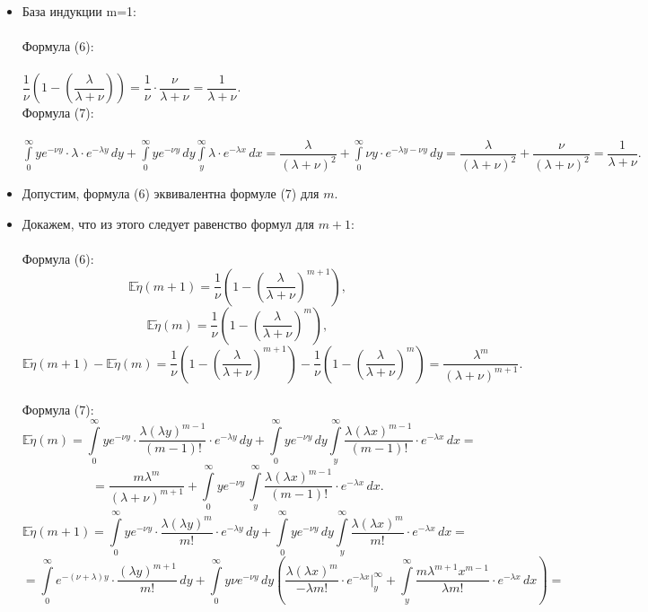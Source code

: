 \documentclass[12pt]{article}
\begin{document}
\begin{itemize}
\item База индукции m=1:\\
\\
Формула (6):\\
\\
$\dfrac{1}{\nu}\left(1-\left(\dfrac{\lambda}{\lambda+\nu}\right)\right) = \dfrac{1}{\nu}\cdot\dfrac{\nu}{\lambda+\nu} = \dfrac{1}{\lambda+\nu}. $\\
Формула (7):\\
\\
$ \int\limits^\infty_0 ye^{-\nu y}\cdot\lambda\cdot e^{-\lambda y}\, dy + \int\limits^\infty_0 ye^{-\nu y}\, dy\int\limits^\infty_y \lambda\cdot e^{-\lambda x}\, dx = \dfrac{\lambda}{(\lambda+\nu)^2} + \int\limits^\infty_0 \nu y \cdot e^{-\lambda y -\nu y}\, dy =   \dfrac{\lambda}{(\lambda+\nu)^2} +  \dfrac{\nu}{(\lambda+\nu)^2} =  \dfrac{1}{\lambda+\nu}.$
\item Допустим, формула (6) эквивалентна формуле (7) для $m$.
\item Докажем, что из этого следует равенство формул для $m+1$:\\
\\
Формула (6):
$$\mathbb{E}\tilde{\eta}(m+1) = \dfrac{1}{\nu}\left(1-\left(\dfrac{\lambda}{\lambda+\nu}\right)^{m+1}\right),$$
$$\mathbb{E}\tilde{\eta}(m) = \dfrac{1}{\nu}\left(1-\left(\dfrac{\lambda}{\lambda+\nu}\right)^{m}\right),$$
$$\mathbb{E}\tilde{\eta}(m+1) - \mathbb{E}\tilde{\eta}(m)= \dfrac{1}{\nu}\left(1-\left(\dfrac{\lambda}{\lambda+\nu}\right)^{m+1}\right) -\dfrac{1}{\nu}\left(1-\left(\dfrac{\lambda}{\lambda+\nu}\right)^{m}\right) = \dfrac{\lambda^m}{(\lambda+\nu)^{m+1}}.$$
\\
Формула (7):
$$\mathbb{E}\tilde{\eta}(m) = \int\limits^\infty_0 ye^{-\nu y}\cdot\dfrac{\lambda(\lambda y)^{m-1}}{(m-1)!}\cdot e^{-\lambda y}\, dy + \int\limits^\infty_0 ye^{-\nu y}\, dy\int\limits^\infty_y \dfrac{\lambda(\lambda x)^{m-1}}{(m-1)!}\cdot e^{-\lambda x}\, dx =$$
$$=  \dfrac{m\lambda^m}{(\lambda+\nu)^{m+1}}+\int\limits^\infty_0 ye^{-\nu y}\,\int\limits^\infty_y \dfrac{\lambda(\lambda x)^{m-1}}{(m-1)!}\cdot e^{-\lambda x}\, dx. $$ 
$$\mathbb{E}\tilde{\eta}(m+1) = \int\limits^\infty_0 ye^{-\nu y}\cdot\dfrac{\lambda(\lambda y)^{m}}{m!}\cdot e^{-\lambda y}\, dy + \int\limits^\infty_0 ye^{-\nu y}\, dy\int\limits^\infty_y \dfrac{\lambda(\lambda x)^{m}}{m!}\cdot e^{-\lambda x}\, dx =$$
$$=\int\limits^\infty_0 e^{-(\nu+\lambda) y}\cdot\dfrac{(\lambda y)^{m+1}}{m!}\,dy +\int\limits^\infty_0 y\nu e^{-\nu y}\, dy\left(\dfrac{\lambda(\lambda x)^{m}}{-\lambda m!}\cdot e^{-\lambda x}\bigg|^\infty_y + \int\limits^\infty_y \dfrac{m \lambda^{m+1} x^{m-1}}{\lambda m!}\cdot e^{-\lambda x}\, dx \right)=$$

\end{itemize}
\end{document}

